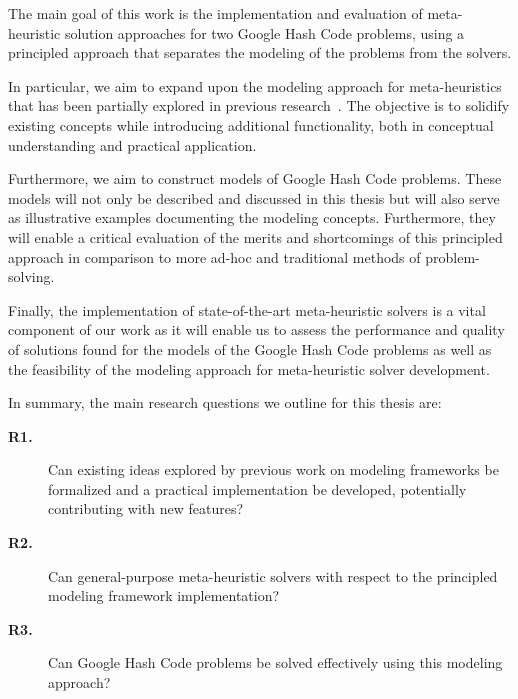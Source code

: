 The main goal of this work is the implementation and evaluation of meta-
heuristic solution approaches for two Google Hash Code problems, using a
principled approach that separates the modeling of the problems from the
solvers.

In particular, we aim to expand upon the modeling approach for meta-heuristics
that has been partially explored in previous
research~\cite{vieira2009uma,fonseca2021nasf4nio,outeiro2021application}. The
objective is to solidify existing concepts while introducing additional
functionality, both in conceptual understanding and practical application.

Furthermore, we aim to construct models of Google Hash Code problems. These
models will not only be described and discussed in this thesis but will also
serve as illustrative examples documenting the modeling concepts. Furthermore,
they will enable a critical evaluation of the merits and shortcomings of this
principled approach in comparison to more ad-hoc and traditional methods of
problem-solving.

Finally, the implementation of state-of-the-art meta-heuristic solvers is a
vital component of our work as it will enable us to assess the performance and
quality of solutions found for the models of the Google Hash Code problems as
well as the feasibility of the modeling approach for meta-heuristic solver
development.

In summary, the main research questions we outline for this thesis are:

\begin{description}
  \item[\textbf{R1.}] Can existing ideas explored by previous work on modeling
    frameworks \cite{vieira2009uma,fonseca2021nasf4nio,outeiro2021application}
    be formalized and a practical implementation be developed, potentially contributing with new
    features?

  \item[\textbf{R2.}] Can general-purpose meta-heuristic solvers with respect to
    the principled modeling framework implementation?

  \item[\textbf{R3.}] Can Google Hash Code problems be solved effectively using
    this modeling approach?
\end{description}